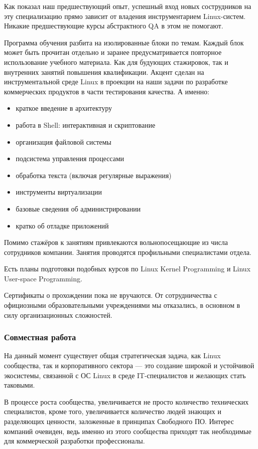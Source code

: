 \documentclass[10pt, a5paper]{article}
\begin{document}
Как показал наш предшествующий опыт, успешный вход новых сострудников на эту специализацию прямо зависит от владения инструментарием Linux-систем. Никакие предшествующие курсы абстрактного QA в этом не помогают.

Программа обучения разбита на изолированные блоки по темам. Каждый блок может быть прочитан отдельно и заранее предусматривается повторное использование учебного материала. Как для будующих стажировок, так и внутренних занятий повышения квалификации.
Акцент сделан на инструментальной среде Linux в проекции на наши задачи по разработке коммерческих продуктов в части тестирования качества. А именно:

\begin{itemize}
  \item краткое введение в архитектуру
  \item работа в Shell: интерактивная и скриптование
  \item организация файловой системы
  \item подсистема управления процессами
  \item обработка текста (включая регулярные выражения)
  \item инструменты виртуализации
  \item базовые сведения об администрировании
  \item кратко об отладке приложений
\end{itemize}

Помимо стажёров к занятиям привлекаются вольнопосещающие из числа сотрудников компании. Занятия проводятся профильными специалистами отдела.

Есть планы подготовки подобных курсов по Linux Kernel Programming и Linux User-space Programming.

Сертификаты о прохождении пока не вручаются. От сотрудничества с официозными образовательными учреждениями мы отказались, в основном в силу организационных сложностей.

\subsubsection*{Совместная работа}

На данный момент существует общая стратегическая задача, как Linux сообщества, так и корпоративного сектора --- это создание широкой и устойчивой экосистемы, связанной с ОС Linux в среде IT-специалистов и желающих стать таковыми.

В процессе роста сообщества, увеличивается не просто количество технических специалистов, кроме того, увеличивается количество людей знающих и разделяющих ценности, заложенные в принципах Свободного ПО.
Интерес компаний очевиден, ведь  именно из этого сообщества приходят так необходимые для коммерческой разработки профессионалы.
\end{document}

